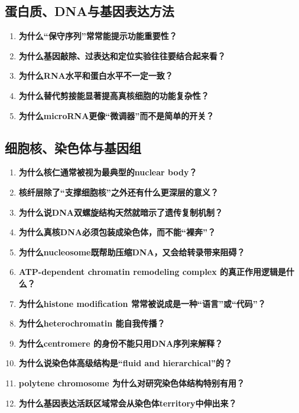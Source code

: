 \documentclass[12pt,fontset=none]{ctexart}
\begin{document}
\subsection*{蛋白质、DNA与基因表达方法}
\begin{enumerate}
\item \textbf{为什么“保守序列”常常能提示功能重要性？}

\item \textbf{为什么基因敲除、过表达和定位实验往往要结合起来看？}

\item \textbf{为什么RNA水平和蛋白水平不一定一致？}

\item \textbf{为什么替代剪接能显著提高真核细胞的功能复杂性？}

\item \textbf{为什么microRNA更像“微调器”而不是简单的开关？}

\end{enumerate}



\subsection*{细胞核、染色体与基因组}
\begin{enumerate}
\item \textbf{为什么核仁通常被视为最典型的nuclear body？}

\item \textbf{核纤层除了“支撑细胞核”之外还有什么更深层的意义？}

\item \textbf{为什么说DNA双螺旋结构天然就暗示了遗传复制机制？}

\item \textbf{为什么真核DNA必须包装成染色体，而不能“裸奔”？}

\item \textbf{为什么nucleosome既帮助压缩DNA，又会给转录带来阻碍？}

\item \textbf{ATP-dependent chromatin remodeling complex 的真正作用逻辑是什么？}

\item \textbf{为什么histone modification 常常被说成是一种“语言”或“代码”？}

\item \textbf{为什么heterochromatin 能自我传播？}

\item \textbf{为什么centromere 的身份不能只用DNA序列来解释？}

\item \textbf{为什么说染色体高级结构是“fluid and hierarchical”的？}

\item \textbf{polytene chromosome 为什么对研究染色体结构特别有用？}

\item \textbf{为什么基因表达活跃区域常会从染色体territory中伸出来？}

\end{enumerate}
\end{document}
